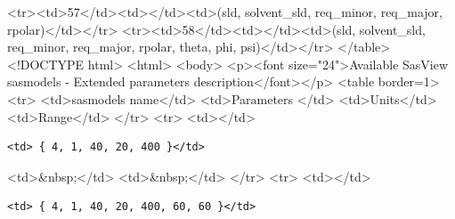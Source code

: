 \textless{}tr\textgreater{}\textless{}td\textgreater{}57\textless{}/td\textgreater{}\textless{}td\textgreater{}\textless{}/td\textgreater{}\textless{}td\textgreater{}(sld, solvent\_sld, req\_minor, req\_major, rpolar)\textless{}/td\textgreater{}\textless{}/tr\textgreater{} \textless{}tr\textgreater{}\textless{}td\textgreater{}58\textless{}/td\textgreater{}\textless{}td\textgreater{}\textless{}/td\textgreater{}\textless{}td\textgreater{}(sld, solvent\_sld, req\_minor, req\_major, rpolar, theta, phi, psi)\textless{}/td\textgreater{}\textless{}/tr\textgreater{} \textless{}/table\textgreater{} \textless{}!DOCTYPE html\textgreater{} \textless{}html\textgreater{} \textless{}body\textgreater{} \textless{}p\textgreater{}\textless{}font size="24"\textgreater{}Available SasView sasmodels - Extended parameters description\textless{}/font\textgreater{}\textless{}/p\textgreater{} \textless{}table border=1\textgreater{} \textless{}tr\textgreater{} \textless{}td\textgreater{}sasmodels name\textless{}/td\textgreater{} \textless{}td\textgreater{}Parameters \textless{}/td\textgreater{} \textless{}td\textgreater{}Units\textless{}/td\textgreater{} \textless{}td\textgreater{}Range\textless{}/td\textgreater{} \textless{}/tr\textgreater{} \textless{}tr\textgreater{} \textless{}td\textgreater{}\textless{}/td\textgreater{}

\begin{verbatim}
<td> { 4, 1, 40, 20, 400 }</td>
\end{verbatim}

\textless{}td\textgreater{}\&nbsp;\textless{}/td\textgreater{} \textless{}td\textgreater{}\&nbsp;\textless{}/td\textgreater{} \textless{}/tr\textgreater{} \textless{}tr\textgreater{} \textless{}td\textgreater{}\textless{}/td\textgreater{}

\begin{verbatim}
<td> { 4, 1, 40, 20, 400, 60, 60 }</td>
\end{verbatim}

